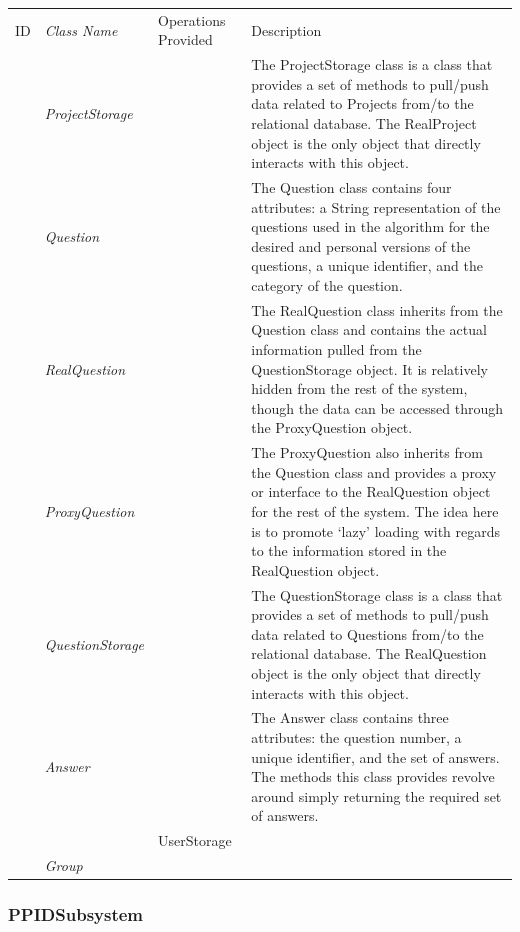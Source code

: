 \documentclass[12pt,letterpaper]{article}
\begin{document}
\begin{center}
\begin{tabu} to 
	\tableheader{}ID & Class Name & Operations Provided & Description \\
	 & ProjectStorage & & The ProjectStorage class is a class that provides a set of methods to pull/push data related to Projects from/to the relational database. The RealProject object is the only object that directly interacts with this object.\\
	 & Question & & The Question class contains four attributes: a String representation of the questions used in the algorithm for the desired and personal versions of the questions, a unique identifier, and the category of the question. \\
	 & RealQuestion & & The RealQuestion class inherits from the Question class and contains the actual information pulled from the QuestionStorage object. It is relatively hidden from the rest of the system, though the data can be accessed through the ProxyQuestion object.\\
	 & ProxyQuestion & & The ProxyQuestion also inherits from the Question class and provides a proxy or interface to the RealQuestion object for the rest of the system. The idea here is to promote `lazy' loading with regards to the information stored in the RealQuestion object.\\
	 & QuestionStorage & & The QuestionStorage class is a class that provides a set of methods to pull/push data related to Questions from/to the relational database. The RealQuestion object is the only object that directly interacts with this object.\\
	 & Answer & & The Answer class contains three attributes: the question number, a unique identifier, and the set of answers. The methods this class provides revolve around simply returning the required set of answers.\\
	 & & UserStorage & \\
	 & Group & & \\
\end{tabu}
\end{center}

\subsubsection*{PPIDSubsystem}
\end{document}
